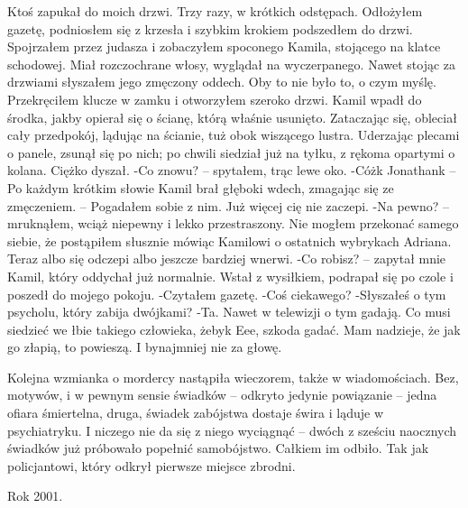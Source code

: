 \documentclass[../MAIN.tex]{subfiles}
\begin{document}
Ktoś zapukał do moich drzwi. Trzy razy, w krótkich odstępach. Odłożyłem gazetę, podniosłem się z krzesła i szybkim krokiem podszedłem do drzwi. Spojrzałem przez judasza i zobaczyłem spoconego Kamila, stojącego na klatce schodowej. Miał rozczochrane włosy, wyglądał na wyczerpanego. Nawet stojąc za drzwiami słyszałem jego zmęczony oddech.
Oby to nie było to, o czym myślę.
Przekręciłem klucze w zamku i otworzyłem szeroko drzwi. Kamil wpadł do środka, jakby opierał się o ścianę, którą właśnie usunięto. Zataczając się, obleciał cały przedpokój, lądując na ścianie, tuż obok wiszącego lustra. Uderzając plecami o panele, zsunął się po nich; po chwili siedział już na tyłku, z rękoma opartymi o kolana. Ciężko dyszał.
-Co znowu? -- spytałem, trąc lewe oko.
-Cóż\3k Jonathan\3k -- Po każdym krótkim słowie Kamil brał głęboki wdech, zmagając się ze zmęczeniem. -- Pogadałem sobie z nim. Już więcej cię nie zaczepi.
-Na pewno? -- mruknąłem, wciąż niepewny i lekko przestraszony. Nie mogłem przekonać samego siebie, że postąpiłem słusznie mówiąc Kamilowi o ostatnich wybrykach Adriana. Teraz albo się odczepi albo jeszcze bardziej wnerwi.
-Co robisz? -- zapytał mnie Kamil, który oddychał już normalnie. Wstał z wysiłkiem, podrapał się po czole i poszedł do mojego pokoju.
-Czytałem gazetę.
-Coś ciekawego?
-Słyszałeś o tym psycholu, który zabija dwójkami?
-Ta. Nawet w telewizji o tym gadają. Co musi siedzieć we łbie takiego człowieka, żeby\3k Eee, szkoda gadać. Mam nadzieje, że jak go złapią, to powieszą. I bynajmniej nie za głowę.


Kolejna wzmianka o mordercy nastąpiła wieczorem, także w wiadomościach.
Bez, motywów, i w pewnym sensie świadków -- odkryto jedynie powiązanie -- jedna ofiara śmiertelna, druga, świadek zabójstwa dostaje świra i ląduje w psychiatryku. I niczego nie da się z niego wyciągnąć -- dwóch z sześciu naocznych świadków już próbowało popełnić samobójstwo. Całkiem im odbiło. Tak jak policjantowi, który odkrył pierwsze miejsce zbrodni.


Rok 2001.
\end{document}
